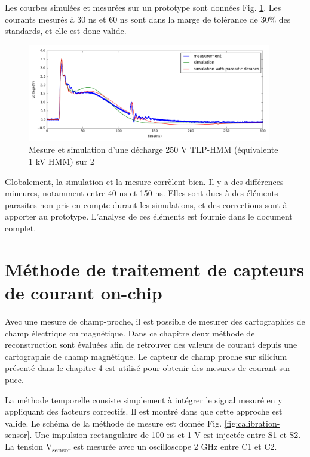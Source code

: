 Les courbes simulées et mesurées sur un prototype sont données Fig. \ref{fig:tlp_hmm_waveforms}.
Les courants mesurés à 30 ns et 60 ns sont dans la marge de tolérance de 30\% des standards, et elle est donc valide.

\begin{figure}[!h]
  \centering
  \includegraphics[width=0.95\textwidth]{src/1/figures/tlp_hmm_waveforms.png}
  \caption{Mesure et simulation d'une décharge 250 V TLP-HMM (équivalente 1 kV HMM) sur 2\textOmega{}}
  \label{fig:tlp_hmm_waveforms}
\end{figure}

Globalement, la simulation et la mesure corrèlent bien.
Il y a des différences mineures, notamment entre 40 ns et 150 ns.
Elles sont dues à des éléments parasites non pris en compte durant les simulations, et des corrections sont à apporter au prototype.
L'analyse de ces éléments est fournie dans le document complet.

\section{Méthode de traitement de capteurs de courant on-chip}

Avec une mesure de champ-proche, il est possible de mesurer des cartographies de champ électrique ou magnétique.
Dans ce chapitre deux méthode de reconstruction sont évaluées afin de retrouver des valeurs de courant depuis une cartographie de champ magnétique.
Le capteur de champ proche sur silicium présenté dans le chapitre 4 est utilisé pour obtenir des mesures de courant sur puce.

La méthode temporelle consiste simplement à intégrer le signal mesuré en y appliquant des facteurs correctifs.
Il est montré dans \cite{near-field-scan} que cette approche est valide.
Le schéma de la méthode de mesure est donnée Fig. \ref{fig:calibration-sensor}.
Une impulsion rectangulaire de 100 ns et 1 V est injectée entre S1 et S2.
La tension V\textsubscript{sensor} est mesurée avec un oscilloscope 2 GHz entre C1 et C2.

